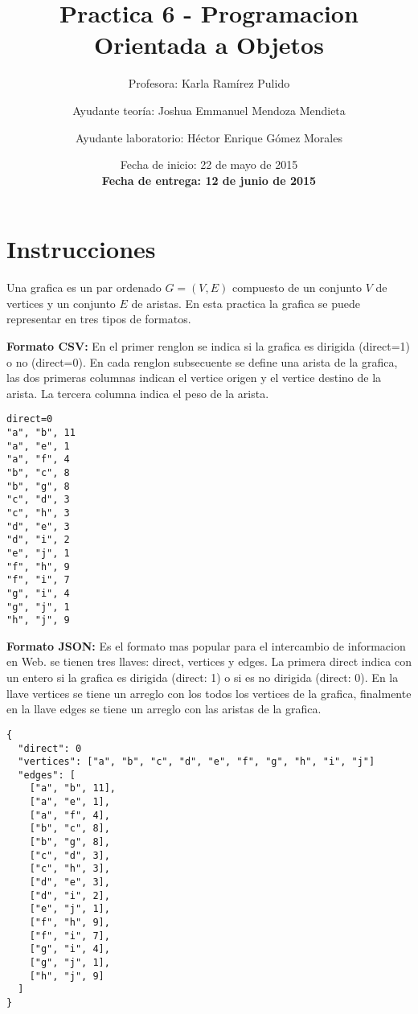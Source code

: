 \documentclass{article}
\author{Profesora: Karla Ramírez Pulido \and
  Ayudante teoría: Joshua Emmanuel Mendoza Mendieta \and
  Ayudante laboratorio: Héctor Enrique Gómez Morales}
\title{Practica 6 - Programacion Orientada a Objetos}
\date{Fecha de inicio: 22 de mayo de 2015\\
  \textbf{Fecha de entrega: 12 de junio de 2015}}
\begin{document}
\maketitle
\section{Instrucciones}

Una grafica es un par ordenado $G = (V, E)$ compuesto de un conjunto $V$ de vertices y un conjunto $E$ de aristas.
En esta practica la grafica se puede representar en tres tipos de formatos.


\textbf{Formato CSV:} En el primer renglon se indica si la grafica es dirigida (direct=1) o no (direct=0).
En cada renglon subsecuente se define una arista de la grafica, las dos primeras columnas indican
el vertice origen y el vertice destino de la arista. La tercera columna indica el peso de la arista.

\begin{verbatim}
direct=0
"a", "b", 11
"a", "e", 1
"a", "f", 4
"b", "c", 8
"b", "g", 8
"c", "d", 3
"c", "h", 3
"d", "e", 3 
"d", "i", 2
"e", "j", 1
"f", "h", 9
"f", "i", 7
"g", "i", 4
"g", "j", 1
"h", "j", 9
\end{verbatim}


\textbf{Formato JSON:} Es el formato mas popular para el intercambio de informacion en Web. se tienen tres llaves: direct, vertices y edges. La primera direct indica con un entero si la grafica es dirigida (direct: 1) o si es no dirigida (direct: 0). En la llave vertices se tiene un arreglo con los todos los vertices de la grafica, finalmente en la
llave edges se tiene un arreglo con las aristas de la grafica. 

\begin{verbatim}
{
  "direct": 0
  "vertices": ["a", "b", "c", "d", "e", "f", "g", "h", "i", "j"]
  "edges": [
    ["a", "b", 11],
    ["a", "e", 1],
    ["a", "f", 4],
    ["b", "c", 8],
    ["b", "g", 8],
    ["c", "d", 3],
    ["c", "h", 3],
    ["d", "e", 3],
    ["d", "i", 2],
    ["e", "j", 1],
    ["f", "h", 9],
    ["f", "i", 7],
    ["g", "i", 4],
    ["g", "j", 1],
    ["h", "j", 9]
  ]
}
\end{verbatim}
\end{document}
